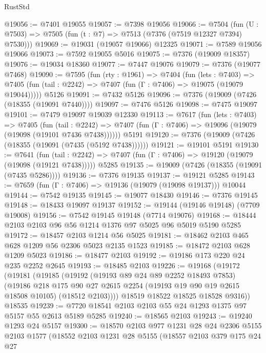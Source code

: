 \begin{lexlean}{RustStd}
\begin{coremodule}
@19056 := @7401 @19055
@19057 := @7398 @19056
@19066 := @7504
    (fun (U : @7503) => @7505 (fun (t : @7) => @7513 (@7376 (@7519 @12327 @7394) @7530)))
@19069 := @19031 (@19057 @19066) @12325
@19071 := @7589 @19056 @19066
@19073 := @7592 @19055 @5016
@19075 := @7376 (@19009 @18357)
@19076 := @19034 @18360
@19077 := @7447 @19076
@19079 := @7376 (@19077 @7468)
@19090 := @7595
    (fun (rty : @1961) =>
    @7404
      (fun (lets : @7403) =>
      @7405 (fun (tail : @2242) => @7407 (fun (Γ : @7406) => @19075 (@19079 @19044)))))
    @5126
@19091 := @7432 @5126
@19096 := @7376 (@19009 (@7426 (@18355 (@19091 @7440))))
@19097 := @7476 @5126
@19098 := @7475 @19097
@19101 := @7479 @19097 @19039 @12330
@19113 := @7617
    (fun (lets : @7403) =>
    @7405
      (fun (tail : @2242) =>
      @7407 (fun (Γ : @7406) => @19096 (@19079 (@19098 (@19101 @7436 @7438))))))
    @5191
@19120 := @7376 (@19009 (@7426 (@18355 (@19091 (@7435 (@5192 @7438))))))
@19121 := @19101 @5191
@19130 := @7641
    (fun (tail : @2242) => @7407 (fun (Γ : @7406) => @19120 (@19079 (@19098 (@19121 @7438)))))
    @5285
@19135 := @19009 (@7426 (@18355 (@19091 (@7435 @5286))))
@19136 := @7376 @19135
@19137 := @19121 @5285
@19143 := @7659 (fun (Γ : @7406) => @19136 (@19079 (@19098 @19137))) @10044
@19144 := @7542 @19135
@19145 := @19077 @18430
@19146 := @7376 @19145
@19148 := @18433 @19097 @19137
@19152 := @19144 (@19146 @19148) (@7709 @19008)
@19156 := @7542 @19145 @19148 (@7714 @19076)
@19168 := @18444 @2103 @2103 @96 @56 @1214 @1376 @97 @5025 @96 @5019 @5190 @5285
@19172 := @18457 @2103 @1214 @56 @5025
@19181 := @18462 @2103 @465 @628 @1209 @56 @2306 @5023 @2135 @1523
@19185 := @18472 @2103 @628 @1209 @5023
@19186 := @18477 @2103
@19192 := @19186 @173 @220 @24 @235 @2252 @2645
@19193 := @18485 @2103
@19226 := @19168
    (@19172
      (@19181
        (@19185
          (@19192
            (@19193 @89 @24 @89 @2252 @18493 @7853)
            (@19186
              @218
              @175
              @90
              @27
              @2615
              @2254
              (@19193 @19 @90 @19 @2615 @18508 @10105)
              (@18512 @2103))))
        @18519
        @18522
        @18525
        @18528
        @9316))
    @18535
@19239 := @7720 @18541 @2103 @2103 @55 @24 @1293 @1375 @97 @5157 @55 @2613 @5189 @5285
@19240 := @18565 @2103
@19243 := @19240 @1293 @24 @5157
@19300 := @18570
    @2103
    @977
    @1231
    @28
    @24
    @2306
    @5155
    @2103
    @1577
    (@18552
      @2103
      @1231
      @28
      @5155
      (@18557
        @2103
        @379
        @175
        @24
        @27

\end{coremodule}
\end{lexlean}
